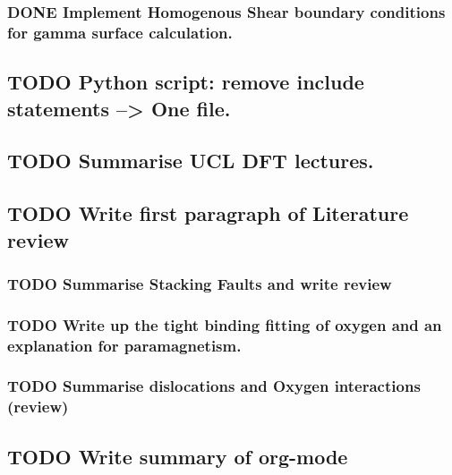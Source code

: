 \documentclass[11pt]{article}
\begin{document}
\subsubsection{{\bfseries\sffamily DONE} Implement Homogenous Shear boundary conditions for gamma surface calculation.}
\label{sec-1-2-3}
\subsection{{\bfseries\sffamily TODO} Python script: remove include statements  -->  One file.}
\label{sec-1-3}
\subsection{{\bfseries\sffamily TODO} Summarise UCL DFT lectures.}
\label{sec-1-4}
\subsection{{\bfseries\sffamily TODO} Write first paragraph of Literature review}
\label{sec-1-5}
\subsubsection{{\bfseries\sffamily TODO} Summarise Stacking Faults and write review}
\label{sec-1-5-1}
\subsubsection{{\bfseries\sffamily TODO} Write up the tight binding fitting of oxygen and an explanation for paramagnetism.}
\label{sec-1-5-2}
\subsubsection{{\bfseries\sffamily TODO} Summarise dislocations and Oxygen interactions (review)}
\label{sec-1-5-3}
\subsection{{\bfseries\sffamily TODO} Write summary of org-mode}
\label{sec-1-6}
\end{document}
